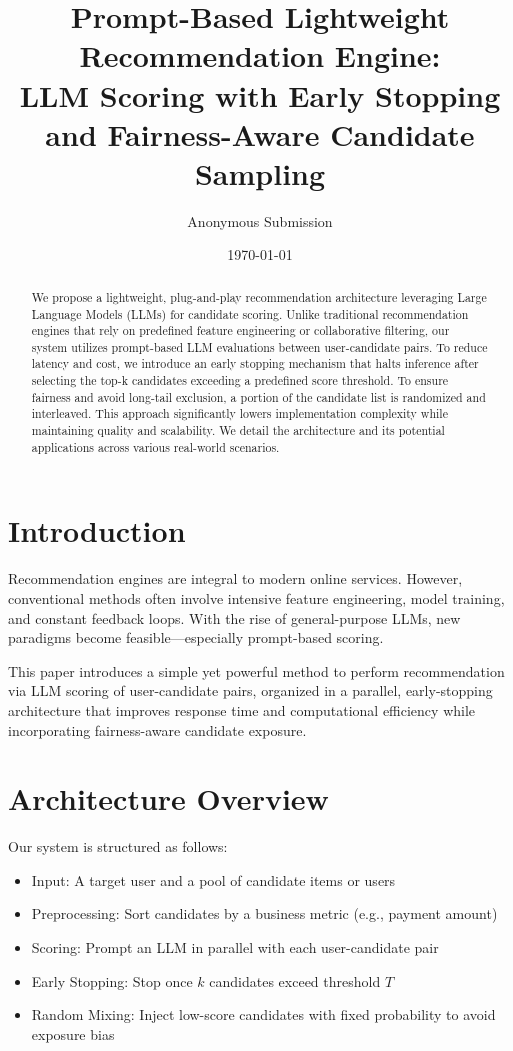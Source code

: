 \documentclass[11pt]{article}
\title{Prompt-Based Lightweight Recommendation Engine: \\ LLM Scoring with Early Stopping and Fairness-Aware Candidate Sampling}
\author{Anonymous Submission}
\date{\today}
\begin{document}
\maketitle

\begin{abstract}
We propose a lightweight, plug-and-play recommendation architecture leveraging Large Language Models (LLMs) for candidate scoring. Unlike traditional recommendation engines that rely on predefined feature engineering or collaborative filtering, our system utilizes prompt-based LLM evaluations between user-candidate pairs. To reduce latency and cost, we introduce an early stopping mechanism that halts inference after selecting the top-k candidates exceeding a predefined score threshold. To ensure fairness and avoid long-tail exclusion, a portion of the candidate list is randomized and interleaved. This approach significantly lowers implementation complexity while maintaining quality and scalability. We detail the architecture and its potential applications across various real-world scenarios.
\end{abstract}

\section{Introduction}
Recommendation engines are integral to modern online services. However, conventional methods often involve intensive feature engineering, model training, and constant feedback loops. With the rise of general-purpose LLMs, new paradigms become feasible---especially prompt-based scoring.

This paper introduces a simple yet powerful method to perform recommendation via LLM scoring of user-candidate pairs, organized in a parallel, early-stopping architecture that improves response time and computational efficiency while incorporating fairness-aware candidate exposure.

\section{Architecture Overview}

Our system is structured as follows:

\begin{itemize}
    \item Input: A target user and a pool of candidate items or users
    \item Preprocessing: Sort candidates by a business metric (e.g., payment amount)
    \item Scoring: Prompt an LLM in parallel with each user-candidate pair
    \item Early Stopping: Stop once $k$ candidates exceed threshold $T$
    \item Random Mixing: Inject low-score candidates with fixed probability to avoid exposure bias
\end{itemize}
\end{document}
